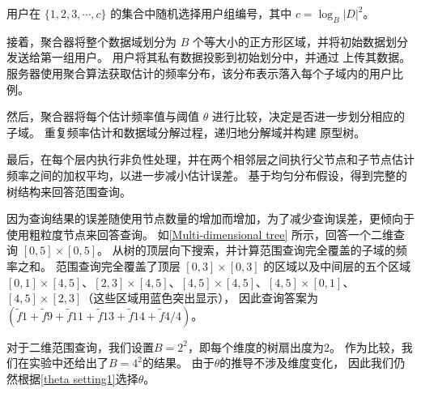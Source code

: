 用户在 $\{1, 2, 3, \cdots, c\}$ 的集合中随机选择用户组编号，其中 $c = \log_B|D|^2$。

接着，聚合器将整个数据域划分为 $B$ 个等大小的正方形区域，并将初始数据划分发送给第一组用户。
用户将其私有数据投影到初始划分中，并通过 \oue 上传其数据。
服务器使用聚合算法获取估计的频率分布，该分布表示落入每个子域内的用户比例。

然后，聚合器将每个估计频率值与阈值 $\theta$ 进行比较，决定是否进一步划分相应的子域。
重复频率估计和数据域分解过程，\myahead 递归地分解域并构建 \myahead 原型树。

最后，\myahead 在每个层内执行非负性处理，并在两个相邻层之间执行父节点和子节点估计频率之间的加权平均，以进一步减小估计误差。
基于均匀分布假设，\myahead 得到完整的树结构来回答范围查询。

因为查询结果的误差随使用节点数量的增加而增加，为了减少查询误差，\myahead 更倾向于使用粗粒度节点来回答查询。
如\autoref{Multi-dimensional tree} 所示，\myahead 回答一个二维查询 $[0,5]\times[0,5]$。 
\myahead 从树的顶层向下搜索，并计算范围查询完全覆盖的子域的频率之和。
范围查询完全覆盖了顶层 $[0,3]\times[0,3]$ 的区域以及中间层的五个区域 $[0,1]\times[4,5]$、$[2,3]\times[4,5]$、$[4,5]\times[4,5]$、$[4,5]\times[0,1]$、$[4,5]\times[2,3]$（这些区域用蓝色突出显示），
因此查询答案为 $(\tilde{f}1 + \tilde{f}9 + \tilde{f}{11} + \tilde{f}{13} + \tilde{f}{14} + \tilde{f}{4}/4)$。

对于二维范围查询，我们设置$B=2^2$，即每个维度的树扇出度为$2$。
作为比较，我们在实验中还给出了$B=4^2$的结果。
由于$\theta$的推导不涉及维度变化，
因此我们仍然根据\autoref{theta setting1}选择$\theta$。

